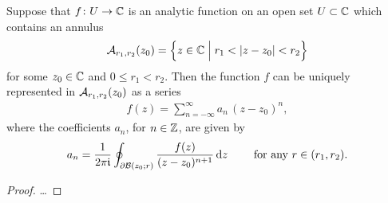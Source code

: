 \begin{theorem}
  \label{thm:ANALYTIC_FUNCTION_LAURENT_SERIES}
  Suppose that $f \colon U \to \bC$ is an analytic function
  on an open set $U \subset \bC$ which contains
  an annulus
  \begin{align*}
    \AnnRRC{r_1}{r_2}{z_0} = \Big\{z \in \bC \; \Big| \; r_1 < |z - z_0| < r_2 \Big\}
  \end{align*}
  for some $z_0 \in \bC$ and $0 \le r_1 < r_2$.
  Then the function $f$ can be uniquely
  represented in $\AnnRRC{r_1}{r_2}{z_0}$ as a series
  \begin{align*}
    f(z) = \sum_{n=-\infty}^\infty a_n \, (z-z_0)^n ,
  \end{align*}
  where the coefficients $a_n$, for $n \in \bZ$, are given by
  \begin{align*}
    a_n = \frac{1}{2\pi \ii}
      \oint_{\bdry \BallRC{r}{z_0}} \frac{f(z)}{(z - z_0)^{n+1}} \, \ud z
    \qquad \text{ for any } r \in (r_1, r_2) .
  \end{align*}
\end{theorem}
\begin{proof}
  \ldots
\end{proof}
